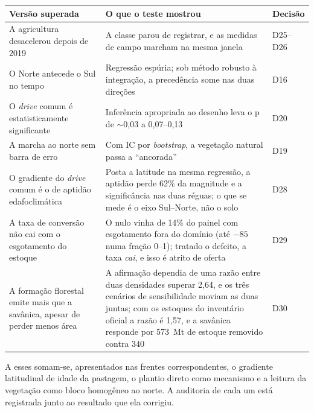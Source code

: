 \begin{quadro}[htb]
\centering
\caption[Resultados superados e o teste que os superou]{Resultados superados e o teste que os superou.}
\label{quadro:superados}
\small
\begin{tabular}{p{4.2cm}p{4.6cm}p{4.4cm}}
\toprule
\textbf{Versão superada} & \textbf{O que o teste mostrou} & \textbf{Decisão} \\
\midrule
A agricultura desacelerou depois de 2019 &
A classe parou de registrar, e as medidas de campo marcham na mesma janela &
D25--D26 \\
\addlinespace
O Norte antecede o Sul no tempo &
Regressão espúria; sob método robusto à integração, a precedência some nas
duas direções &
D16 \\
\addlinespace
O \emph{drive} comum é estatisticamente significante &
Inferência apropriada ao desenho leva o p de $\sim$0,03 a 0,07--0,13 &
D20 \\
\addlinespace
A marcha ao norte sem barra de erro &
Com IC por \emph{bootstrap}, a vegetação natural passa a ``ancorada'' &
D19 \\
\addlinespace
O gradiente do \emph{drive} comum é o de aptidão edafoclimática &
Posta a latitude na mesma regressão, a aptidão perde 62\% da magnitude e a
significância nas duas réguas; o que se mede é o eixo Sul--Norte, não o solo &
D28 \\
\addlinespace
A taxa de conversão não cai com o esgotamento do estoque &
O nulo vinha de 14\% do painel com esgotamento fora do domínio (até $-85$ numa
fração 0--1); tratado o defeito, a taxa \emph{cai}, e isso é atrito de oferta &
D29 \\
\addlinespace
A formação florestal emite mais que a savânica, apesar de perder menos área &
A afirmação dependia de uma razão entre duas densidades superar 2,64, e os três
cenários de sensibilidade moviam as duas juntas; com os estoques do inventário
oficial a razão é 1,57, e a savânica responde por 573~Mt de estoque removido
contra 340 &
D30 \\
\bottomrule
\end{tabular}
\end{quadro}

A esses somam-se, apresentados nas frentes correspondentes, o gradiente
latitudinal de idade da pastagem, o plantio direto como mecanismo e a leitura
da vegetação como bloco homogêneo ao norte. A auditoria de cada um está
registrada junto ao resultado que ela corrigiu.
